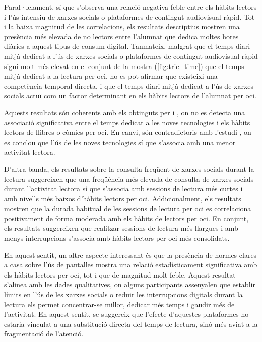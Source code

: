 \documentclass[12pt]{article}
\begin{document}
Paral·lelament, sí que s’observa una relació negativa feble entre els hàbits lectors i l’ús intensiu de xarxes socials o plataformes de contingut audiovisual ràpid. Tot i la baixa magnitud de les correlacions, els resultats descriptius mostren una presència més elevada de no lectors entre l’alumnat que dedica moltes hores diàries a aquest tipus de consum digital. Tanmateix, malgrat que el temps diari mitjà dedicat a l’ús de xarxes socials o plataformes de contingut audiovisual ràpid sigui molt més elevat en el conjunt de la mostra (\autoref{fig:tric_time}) que el temps mitjà dedicat a la lectura per oci, no es pot afirmar que existeixi una competència temporal directa, i que el temps diari mitjà dedicat a l’ús de xarxes socials actuï com un factor determinant en els hàbits lectors de l’alumnat per oci.

Aquests resultats són coherents amb els obtinguts per \textcite{johnsson_bookreading} i \textcite{shutaleva}, on no es detecta una associació significativa entre el temps dedicat a les noves tecnologies i els hàbits lectors de llibres o còmics per oci. En canvi, són contradictoris amb l'estudi \textcite{akande_library}, on es conclou que l'ús de les noves tecnologies sí que s'associa amb una menor activitat lectora.

D'altra banda, els resultats sobre la consulta freqüent de xarxes socials durant la lectura suggereixen que una freqüència més elevada de consulta de xarxes socials durant l'activitat lectora sí que s’associa amb sessions de lectura més curtes i amb nivells més baixos d'hàbits lectors per oci. Addicionalment, els resultats mostren que la durada habitual de les sessions de lectura per oci es correlaciona positivament de forma moderada amb els hàbits de lectors per oci. En conjunt, els resultats suggereixen que realitzar sessions de lectura més llargues i amb menys interrupcions s'associa amb hàbits lectors per oci més consolidats.

En aquest sentit, un altre aspecte interessant és que la presència de normes clares a casa sobre l’ús de pantalles mostra una relació estadísticament significativa amb els hàbits lectors per oci, tot i que de magnitud molt feble. Aquest resultat s’alinea amb les dades qualitatives, on alguns participants assenyalen que establir límits en l’ús de les xarxes socials o reduir les interrupcions digitals durant la lectura els permet concentrar-se millor, dedicar més temps i gaudir més de l'activitat. En aquest sentit, se suggereix que l’efecte d’aquestes plataformes no estaria vinculat a una substitució directa del temps de lectura, sinó més aviat a la fragmentació de l’atenció.
\end{document}
